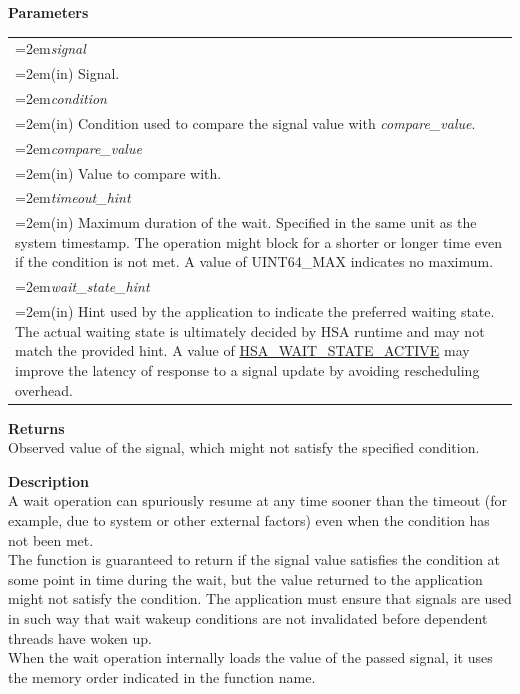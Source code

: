 \documentclass[final,oneside]{book}
\newcommand{\refarg}[1]{\textit{#1}}
\begin{document}
\vspace{-3.5mm}\hspace*{-.3mm}\textbf{Parameters}\\[-7mm]
\noindent\begin{longtable}{@{}>{\hangindent=2em}p{\textwidth}}
\refarg{signal}\\\hspace{2em}(in) Signal.\\[2mm]
\refarg{condition}\\\hspace{2em}(in) Condition used to compare the signal value with \textit{compare_\-value}.\\[2mm]
\refarg{compare_\-value}\\\hspace{2em}(in) Value to compare with.\\[2mm]
\refarg{timeout_\-hint}\\\hspace{2em}(in) Maximum duration of the wait. Specified in the same unit as the system timestamp. The operation might block for a shorter or longer time even if the condition is not met. A value of UINT64_\-MAX indicates no maximum.\\[2mm]
\refarg{wait_\-state_\-hint}\\\hspace{2em}(in) Hint used by the application to indicate the preferred waiting state. The actual waiting state is ultimately decided by HSA runtime and may not match the provided hint. A value of \hyperlink{group__signals_1ggac0d2ec14d7a58c6cccc259943a03c569ac34cddf41039dc646c21d05a91f1dce8}{HSA_\-WAIT_\-STATE_\-ACTIVE} may improve the latency of response to a signal update by avoiding rescheduling overhead.
\end{longtable}
\vspace{-2mm}\noindent\textbf{Returns}\\[1mm]
Observed value of the signal, which might not satisfy the specified condition.

\noindent\textbf{Description}\\
A wait operation can spuriously resume at any time sooner than the timeout (for example, due to system or other external factors) even when the condition has not been met.\\[2mm]
The function is guaranteed to return if the signal value satisfies the condition at some point in time during the wait, but the value returned to the application might not satisfy the condition. The application must ensure that signals are used in such way that wait wakeup conditions are not invalidated before dependent threads have woken up.\\[2mm]
When the wait operation internally loads the value of the passed signal, it uses the memory order indicated in the function name. 
\end{document}
